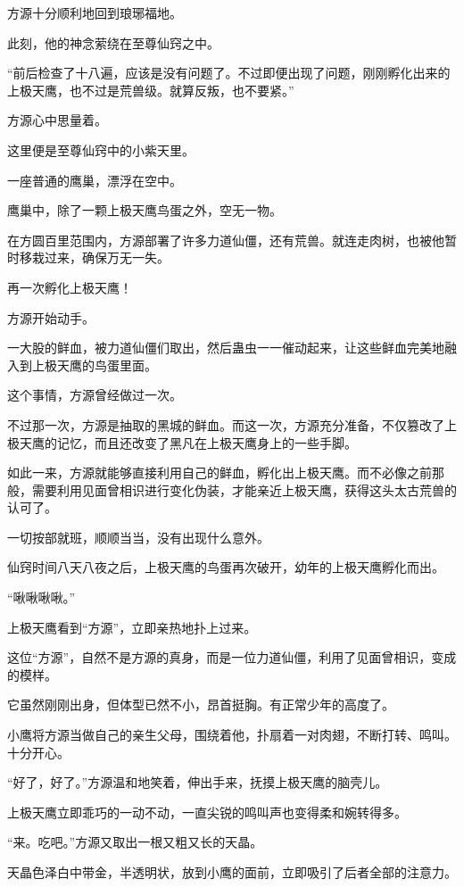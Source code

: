 
\begin{this_body}

方源十分顺利地回到琅琊福地。

此刻，他的神念萦绕在至尊仙窍之中。

“前后检查了十八遍，应该是没有问题了。不过即便出现了问题，刚刚孵化出来的上极天鹰，也不过是荒兽级。就算反叛，也不要紧。”

方源心中思量着。

这里便是至尊仙窍中的小紫天里。

一座普通的鹰巢，漂浮在空中。

鹰巢中，除了一颗上极天鹰鸟蛋之外，空无一物。

在方圆百里范围内，方源部署了许多力道仙僵，还有荒兽。就连走肉树，也被他暂时移栽过来，确保万无一失。

再一次孵化上极天鹰！

方源开始动手。

一大股的鲜血，被力道仙僵们取出，然后蛊虫一一催动起来，让这些鲜血完美地融入到上极天鹰的鸟蛋里面。

这个事情，方源曾经做过一次。

不过那一次，方源是抽取的黑城的鲜血。而这一次，方源充分准备，不仅篡改了上极天鹰的记忆，而且还改变了黑凡在上极天鹰身上的一些手脚。

如此一来，方源就能够直接利用自己的鲜血，孵化出上极天鹰。而不必像之前那般，需要利用见面曾相识进行变化伪装，才能亲近上极天鹰，获得这头太古荒兽的认可了。

一切按部就班，顺顺当当，没有出现什么意外。

仙窍时间八天八夜之后，上极天鹰的鸟蛋再次破开，幼年的上极天鹰孵化而出。

“啾啾啾啾。”

上极天鹰看到“方源”，立即亲热地扑上过来。

这位“方源”，自然不是方源的真身，而是一位力道仙僵，利用了见面曾相识，变成的模样。

它虽然刚刚出身，但体型已然不小，昂首挺胸。有正常少年的高度了。

小鹰将方源当做自己的亲生父母，围绕着他，扑扇着一对肉翅，不断打转、鸣叫。十分开心。

“好了，好了。”方源温和地笑着，伸出手来，抚摸上极天鹰的脑壳儿。

上极天鹰立即乖巧的一动不动，一直尖锐的鸣叫声也变得柔和婉转得多。

“来。吃吧。”方源又取出一根又粗又长的天晶。

天晶色泽白中带金，半透明状，放到小鹰的面前，立即吸引了后者全部的注意力。


\end{this_body}
